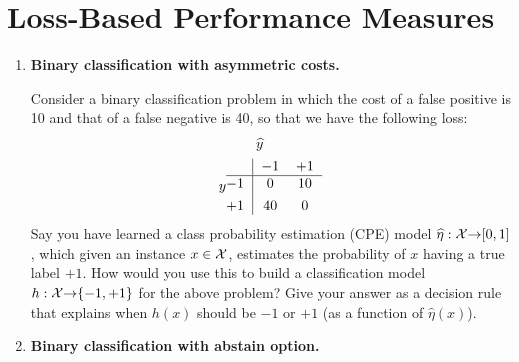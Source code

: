 \section{Loss-Based Performance Measures}
%
\begin{enumerate}
\item
\textbf{Binary classification with asymmetric costs.}

Consider a binary classification problem in which the cost of a false positive is 10 and that of a false negative is 40, so that we have the following loss:
%
\vspace{-12pt}
\begin{eqnarray*}
& \rule{0.75cm}{0pt} \hat{y} 
\\
y &
\begin{tabular}{@{}c|cc}
 & $-1$ & $+1$ \\
 \hline
$-1$ & $0$ & $10$ \\[4pt]
$+1$ & $40$ & $0$ \\
\end{tabular}
\end{eqnarray*}
%
Say you have learned a class probability estimation (CPE) model $\widehat{\eta}:{\mathcal X}{\rightarrow}[0,1]$, which given an instance $x\in{\mathcal X}$, estimates the probability of $x$ having a true label $+1$.
How would you use this to build a classification model $h:{\mathcal X}{\rightarrow}\{-1,+1\}$ for the above problem? Give your answer as a decision rule that explains when $h(x)$ should be $-1$ or $+1$ (as a function of $\hat{\eta}(x)$).
\item
\textbf{Binary classification with abstain option.}


\end{enumerate}
